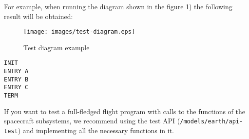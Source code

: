 \documentclass[12pt,a4paper]{article}
\begin{document}
For example, when running the diagram shown in the figure \ref{Pic:TestDiagr}) the following result will be obtained:

\begin{figure}[tbh]
  \begin{center}
    \texttt{[image: images/test-diagram.eps]}
    \caption{Test diagram example}
    \label{Pic:TestDiagr}
  \end{center}
\end{figure}

\begin{verbatim}
INIT
ENTRY A
ENTRY B
ENTRY C
TERM
\end{verbatim}

If you want to test a full-fledged flight program with calls to the functions of the spacecraft subsystems, we recommend using the test API (\verb'/models/earth/api-test') and implementing all the necessary functions in it.
\end{document}
